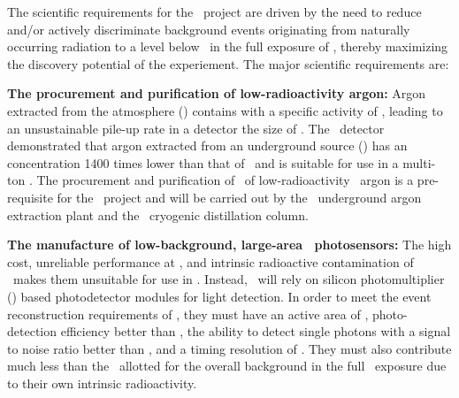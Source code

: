 The scientific requirements for the \DSks\ project are driven by the need to reduce and/or actively discriminate background events originating from naturally occurring radiation to a level below \BackgroundFreeRequirement\ in the full exposure of \DSkExtendedExposure, thereby maximizing the discovery potential of the experiement. The major scientific requirements are:

\begin{asparaenum}

\item[\bf The procurement and purification of low-radioactivity argon:]
Argon extracted from the atmosphere (\AAr) contains  with a specific activity of \DSfAArArThreeNineActivity, leading to an unsustainable pile-up rate in a detector the size of \DSk. The \DSf\ detector demonstrated that argon extracted from an underground source (\UAr) has an  concentration 1400 times lower than that of \AAr\ and is suitable for use in a multi-ton \LArTPC. The procurement and purification of \UraniaTotalDSkProduction\ of low-radioactivity \UAr\ argon is a pre-requisite for the \DSk\ project and will be carried out by the \Urania\ underground argon extraction plant and the \Aria\ cryogenic distillation column.

\item[\bf The manufacture of low-background, large-area \SiPM\ photosensors:]
The high cost, unreliable performance at \LArNormalTemperature, and intrinsic radioactive contamination of \PMTs\ makes them unsuitable for use in \DSk. Instead, \DSk\ will rely on silicon photomultiplier (\SiPM) based photodetector modules for light detection. In order to meet the event reconstruction requirements of \DSk, they must have an active area of \DSkPdmAreaStd, photo-detection efficiency better than \DSkPdmPDESpecification, the ability to detect single photons with a signal to noise ratio better than \DSkTileChargeSNRSpecification, and a timing resolution of \DSkTileTimeResolutionSpecification. They must also contribute much less than the \BackgroundFreeRequirement\ allotted for the overall background in the full \DSkExtendedExposure\ exposure due to their own intrinsic radioactivity.


\end{asparaenum}
